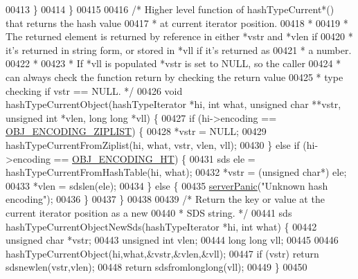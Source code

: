 \begin{DoxyCode}
00413     \}
00414 \}
00415 
00416 \textcolor{comment}{/* Higher level function of hashTypeCurrent*() that returns the hash value}
00417 \textcolor{comment}{ * at current iterator position.}
00418 \textcolor{comment}{ *}
00419 \textcolor{comment}{ * The returned element is returned by reference in either *vstr and *vlen if}
00420 \textcolor{comment}{ * it's returned in string form, or stored in *vll if it's returned as}
00421 \textcolor{comment}{ * a number.}
00422 \textcolor{comment}{ *}
00423 \textcolor{comment}{ * If *vll is populated *vstr is set to NULL, so the caller}
00424 \textcolor{comment}{ * can always check the function return by checking the return value}
00425 \textcolor{comment}{ * type checking if vstr == NULL. */}
00426 \textcolor{keywordtype}{void} hashTypeCurrentObject(hashTypeIterator *hi, \textcolor{keywordtype}{int} what, \textcolor{keywordtype}{unsigned} \textcolor{keywordtype}{char} **vstr, \textcolor{keywordtype}{unsigned} \textcolor{keywordtype}{int} *vlen, \textcolor{keywordtype}{
      long} \textcolor{keywordtype}{long} *vll) \{
00427     \textcolor{keywordflow}{if} (hi->encoding == \hyperlink{server_8h_aabf064ede983103f1fd0df2086e84eee}{OBJ\_ENCODING\_ZIPLIST}) \{
00428         *vstr = NULL;
00429         hashTypeCurrentFromZiplist(hi, what, vstr, vlen, vll);
00430     \} \textcolor{keywordflow}{else} \textcolor{keywordflow}{if} (hi->encoding == \hyperlink{server_8h_a9c10219f68afc557d510d108257d238b}{OBJ\_ENCODING\_HT}) \{
00431         sds ele = hashTypeCurrentFromHashTable(hi, what);
00432         *vstr = (\textcolor{keywordtype}{unsigned} \textcolor{keywordtype}{char}*) ele;
00433         *vlen = sdslen(ele);
00434     \} \textcolor{keywordflow}{else} \{
00435         \hyperlink{server_8h_a11cc378e7778a830b41240578de3b204}{serverPanic}(\textcolor{stringliteral}{"Unknown hash encoding"});
00436     \}
00437 \}
00438 
00439 \textcolor{comment}{/* Return the key or value at the current iterator position as a new}
00440 \textcolor{comment}{ * SDS string. */}
00441 sds hashTypeCurrentObjectNewSds(hashTypeIterator *hi, \textcolor{keywordtype}{int} what) \{
00442     \textcolor{keywordtype}{unsigned} \textcolor{keywordtype}{char} *vstr;
00443     \textcolor{keywordtype}{unsigned} \textcolor{keywordtype}{int} vlen;
00444     \textcolor{keywordtype}{long} \textcolor{keywordtype}{long} vll;
00445 
00446     hashTypeCurrentObject(hi,what,&vstr,&vlen,&vll);
00447     \textcolor{keywordflow}{if} (vstr) \textcolor{keywordflow}{return} sdsnewlen(vstr,vlen);
00448     \textcolor{keywordflow}{return} sdsfromlonglong(vll);
00449 \}
00450 

\end{DoxyCode}
